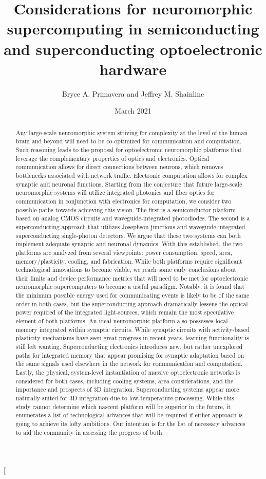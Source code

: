 \documentclass[twocolumn]{article}
\title{\textcolor{OliveGreen}{Considerations for neuromorphic supercomputing in semiconducting and superconducting optoelectronic hardware}}
\author{Bryce A. Primavera and Jeffrey M. Shainline}
\date{March 2021}
\begin{document}
\twocolumn[
\begin{@twocolumnfalse}
\maketitle
\begin{abstract}
Any large-scale neuromorphic system striving for complexity at the level of the human brain and beyond will need to be co-optimized for communication and computation. Such reasoning leads to the proposal for optoelectronic neuromorphic platforms that leverage the complementary properties of optics and electronics. Optical communication allows for direct connections between neurons, which removes bottlenecks associated with network traffic. Electronic computation allows for complex synaptic and neuronal functions. Starting from the conjecture that future large-scale neuromorphic systems will utilize integrated photonics and fiber optics for communication in conjunction with electronics for computation, we consider two possible paths towards achieving this vision. The first is a semiconductor platform based on analog CMOS circuits and waveguide-integrated photodiodes. The second is a superconducting approach that utilizes Josephson junctions and waveguide-integrated superconducting single-photon detectors. We argue that these two systems can both implement adequate synaptic and neuronal dynamics. With this established, the two platforms are analyzed from several viewpoints: power consumption, speed, area, memory/plasticity, cooling, and fabrication. While both platforms require significant technological innovations to become viable, we reach some early conclusions about their limits and device performance metrics that will need to be met for optoelectronic neuromorphic supercomputers to become a useful paradigm. Notably, it is found that the minimum possible energy used for communicating events is likely to be of the same order in both cases, but the superconducting approach dramatically lessens the optical power required of the integrated light-sources, which remain the most speculative element of both platforms. An ideal neuromorphic platform also possesses local memory integrated within synaptic circuits. While synaptic circuits with activity-based plasticity mechanisms have seen great progress in recent years, learning functionality is still left wanting. Superconducting electronics introduces new, but rather unexplored paths for integrated memory that appear promising for synaptic adaptation based on the same signals used elsewhere in the network for communication and computation. Lastly, the physical, system-level instantiation of massive optoelectronic networks is considered for both cases, including cooling systems, area considerations, and the importance and prospects of 3D integration. Superconducting systems appear more naturally suited for 3D integration due to low-temperature processing. While this study cannot determine which nascent platform will be superior in the future, it enumerates a list of technological advances that will be required if either approach is going to achieve its lofty ambitions. Our intention is for the list of necessary advances to aid the community in assessing the progress of both 
\end{abstract}
\end{@twocolumnfalse}
\end{document}
